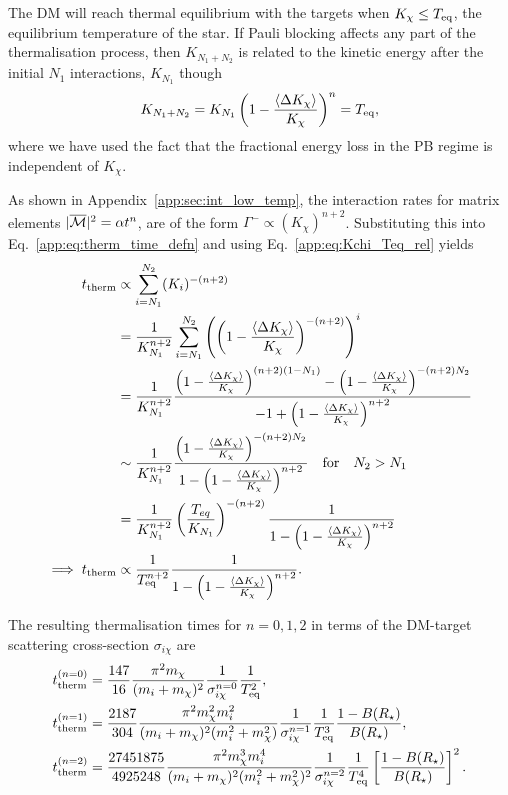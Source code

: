 The DM will reach thermal equilibrium with the targets when $K_\chi \leq T_{\rm eq}$, the equilibrium temperature of the star. 
If Pauli blocking affects any part of the thermalisation process, then $K_{N_1 + N_2}$ is related to the kinetic energy after the initial $N_1$ interactions, $K_{N_1}$ though
\begin{equation}
    K_{N_1 + N_2} = K_{N_1}\left( 1 - \frac{\langle \Delta K_\chi \rangle}{K_{\chi}}\right)^n = T_{\rm eq},
    \label{app:eq:Kchi_Teq_rel}
\end{equation}
where we have used the fact that the fractional energy loss in the PB regime is independent of $K_\chi$.

As shown in Appendix~\ref{app:sec:int_low_temp}, the interaction rates for matrix elements $|\overline{\mathcal M}|^2 = \alpha t^n$, are of the form $\Gamma^-\propto (K_\chi)^{n+2}$. Substituting this into Eq.~\ref{app:eq:therm_time_defn} and using Eq.~\ref{app:eq:Kchi_Teq_rel} yields
\begin{align}
    t_{\rm therm} & \propto \sum_{i=N_1}^{N_2} (K_{i})^{-(n+2)}\\
    & = \frac{1}{K_{N_1}^{n+2}}\sum_{i=N_1}^{N_2}\left(\left( 1 - \frac{\langle \Delta K_\chi \rangle}{K_{\chi}}\right)^{-(n+2)}\right)^i\\
    & = \frac{1}{K_{N_1}^{n+2}}\frac{\left(1 - \frac{\langle \Delta K_\chi \rangle}{K_{\chi}}\right)^{(n+2)(1-N_1)} - \left(1 -\frac{\langle \Delta K_\chi \rangle}{K_{\chi}}\right)^{-(n+2) N_2}}{-1 + \left(1 - \frac{\langle \Delta K_\chi \rangle}{K_{\chi}}\right)^{n+2}}\\
    & \sim  \frac{1}{K_{N_1}^{n+2}} \frac{\left(1 - \frac{\langle \Delta K_\chi \rangle}{K_{\chi}}\right)^{-(n+2) N_2}}{1 - \left(1 - \frac{\langle \Delta K_\chi \rangle}{K_{\chi}}\right)^{n+2}}\quad \text{for}\quad N_2 > N_1\\
    & =  \frac{1}{K_{N_1}^{n+2}} \left( \frac{T_{eq}}{K_{N_1}}\right)^{-(n+2)}\frac{1}{1 - \left(1 - \frac{\langle \Delta K_\chi \rangle}{K_{\chi}}\right)^{n+2}}\\
  \implies t_{\rm therm}  & \propto \frac{1}{T_{\rm eq}^{n+2}}\frac{1}{1 - \left(1 - \frac{\langle \Delta K_\chi \rangle}{K_{\chi}}\right)^{n+2}}.
\end{align}

The resulting thermalisation times for $n = 0, 1, 2$ in terms of the DM-target scattering cross-section $\sigma_{i\chi}$ are
\begin{align}
    t_{\rm therm}^{(n=0)} & = \frac{147}{16}\frac{\pi^2 m_\chi}{(m_i + m_\chi)^2} \frac{1}{\sigma_{i\chi}^{n=0}} \frac{1}{T_{\rm eq}^2},\\
    t_{\rm therm}^{(n=1)} & = \frac{2187}{304}\frac{\pi^2 m_\chi^2 m_i^2}{(m_i + m_\chi)^2(m_i^2 + m_\chi^2)} \frac{1}{\sigma_{i\chi}^{n=1}} \frac{1}{T_{\rm eq}^3}\frac{1 - B(R_\star)}{B(R_\star)},\\
    t_{\rm therm}^{(n=2)} & = \frac{27451875}{4925248}\frac{\pi^2 m_\chi^3m_i^4}{(m_i + m_\chi)^2(m_i^2 + m_\chi^2)^2} \frac{1}{\sigma_{i\chi}^{n=2}} \frac{1}{T_{\rm eq}^4}\left[\frac{1 - B(R_\star)}{B(R_\star)}\right]^2.
\end{align}





